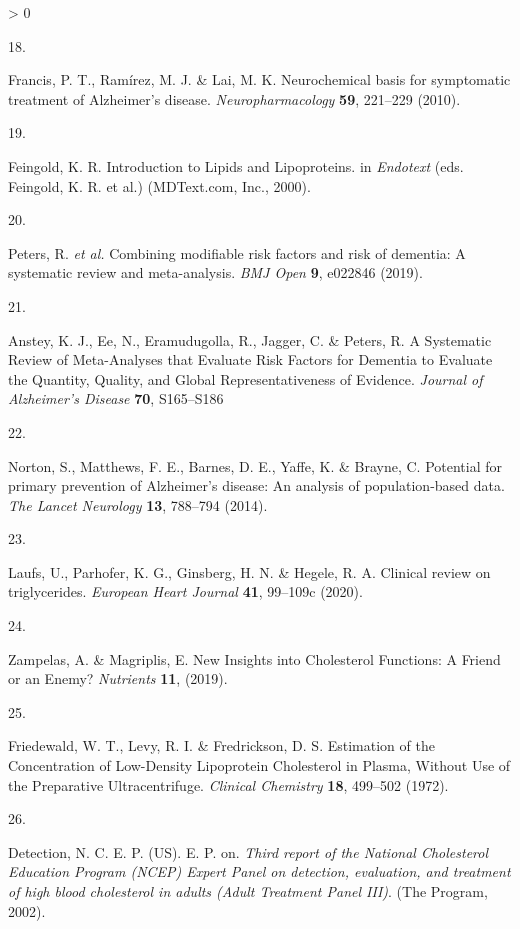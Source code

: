 \documentclass[a4paper, twoside]{templates/ociamthesis}
\newlength{\cslhangindent}
\newlength{\csllabelwidth}
\newenvironment{CSLReferences}[3] %
 {%
  \setlength{\parindent}{0pt}
  \ifodd #1 \everypar{\setlength{\hangindent}{\cslhangindent}}\ignorespaces\fi
  \ifnum #2 > 0
  \setlength{\parskip}{#2\baselineskip}
  \fi
 }%
 {}
\newcommand{\CSLLeftMargin}[1]{\parbox[t]{\maxof{\widthof{#1}}{\csllabelwidth}}{#1}}
\newcommand{\CSLRightInline}[1]{\parbox[t]{\linewidth - \csllabelwidth}{#1}}
\begin{document}
\begin{CSLReferences}{0}{0}
\leavevmode\hypertarget{ref-francis2010}{}%
\CSLLeftMargin{18. }
\CSLRightInline{Francis, P. T., Ramírez, M. J. \& Lai, M. K. Neurochemical basis for symptomatic treatment of {Alzheimer}'s disease. \emph{Neuropharmacology} \textbf{59}, 221--229 (2010).}

\leavevmode\hypertarget{ref-feingold2000}{}%
\CSLLeftMargin{19. }
\CSLRightInline{Feingold, K. R. Introduction to {Lipids} and {Lipoproteins}. in \emph{Endotext} (eds. Feingold, K. R. et al.) ({MDText.com, Inc.}, 2000).}

\leavevmode\hypertarget{ref-peters2019}{}%
\CSLLeftMargin{20. }
\CSLRightInline{Peters, R. \emph{et al.} Combining modifiable risk factors and risk of dementia: A systematic review and meta-analysis. \emph{BMJ Open} \textbf{9}, e022846 (2019).}

\leavevmode\hypertarget{ref-ansteya}{}%
\CSLLeftMargin{21. }
\CSLRightInline{Anstey, K. J., Ee, N., Eramudugolla, R., Jagger, C. \& Peters, R. A {Systematic Review} of {Meta}-{Analyses} that {Evaluate Risk Factors} for {Dementia} to {Evaluate} the {Quantity}, {Quality}, and {Global Representativeness} of {Evidence}. \emph{Journal of Alzheimer's Disease} \textbf{70}, S165--S186}

\leavevmode\hypertarget{ref-norton2014potential}{}%
\CSLLeftMargin{22. }
\CSLRightInline{Norton, S., Matthews, F. E., Barnes, D. E., Yaffe, K. \& Brayne, C. Potential for primary prevention of {Alzheimer}'s disease: An analysis of population-based data. \emph{The Lancet Neurology} \textbf{13}, 788--794 (2014).}

\leavevmode\hypertarget{ref-laufs2020}{}%
\CSLLeftMargin{23. }
\CSLRightInline{Laufs, U., Parhofer, K. G., Ginsberg, H. N. \& Hegele, R. A. Clinical review on triglycerides. \emph{European Heart Journal} \textbf{41}, 99--109c (2020).}

\leavevmode\hypertarget{ref-zampelas2019}{}%
\CSLLeftMargin{24. }
\CSLRightInline{Zampelas, A. \& Magriplis, E. New {Insights} into {Cholesterol Functions}: {A Friend} or an {Enemy}? \emph{Nutrients} \textbf{11}, (2019).}

\leavevmode\hypertarget{ref-friedewald1972}{}%
\CSLLeftMargin{25. }
\CSLRightInline{Friedewald, W. T., Levy, R. I. \& Fredrickson, D. S. Estimation of the {Concentration} of {Low}-{Density Lipoprotein Cholesterol} in {Plasma}, {Without Use} of the {Preparative Ultracentrifuge}. \emph{Clinical Chemistry} \textbf{18}, 499--502 (1972).}

\leavevmode\hypertarget{ref-national2002third}{}%
\CSLLeftMargin{26. }
\CSLRightInline{Detection, N. C. E. P. (US). E. P. on. \emph{Third report of the {National Cholesterol Education Program} ({NCEP}) {Expert Panel} on detection, evaluation, and treatment of high blood cholesterol in adults ({Adult Treatment Panel III})}. ({The Program}, 2002).}


\end{CSLReferences}
\end{document}
